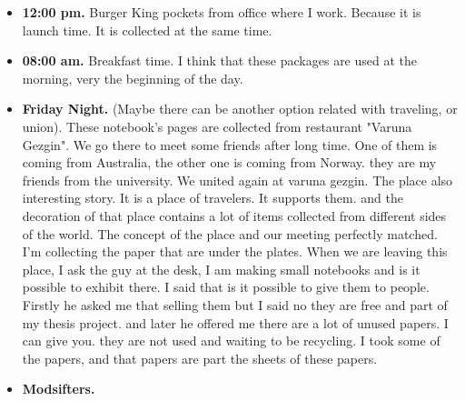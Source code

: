 \begin{itemize}
\item \textbf{12:00 pm.} Burger King pockets from office where I work. Because it is launch time. It is collected at the same time.
\item \textbf{08:00 am.} Breakfast time. I think that these packages are used at the morning, very the beginning of the day.
\item \textbf{Friday Night.} (Maybe there can be another option related with traveling, or union). These notebook's pages are collected from restaurant "Varuna Gezgin". We go there to meet some friends after long time. One of them is coming from Australia, the other one is coming from Norway. they are my friends from the university. We united again at varuna gezgin. The place also interesting story. It is a place of travelers. It supports them. and the decoration of that place contains a lot of items collected from different sides of the world. The concept of the place and our meeting perfectly matched. I'm collecting the paper that are under the plates. When we are leaving this place, I ask the guy at the desk, I am making small notebooks and is it possible to exhibit there. I said that is it possible to give them to people. Firstly he asked me that selling them but I said no they are free and part of my thesis project. and later he offered me there are a lot of unused papers. I can give you. they are not used and waiting to be recycling. I took some of the papers, and that papers are part the sheets of these papers. 
\item \textbf{Modsifters.} 



\end{itemize}

